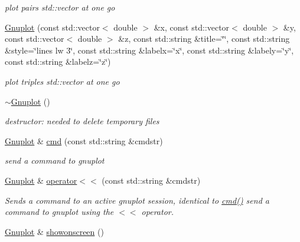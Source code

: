 \begin{DoxyCompactItemize}
\begin{DoxyCompactList}\small\item\em plot pairs std\+::vector at one go \end{DoxyCompactList}\item 
\hyperlink{classkukadu_1_1Gnuplot_a871b56fac856507973efb00861f7cd06}{Gnuplot} (const std\+::vector$<$ double $>$ \&x, const std\+::vector$<$ double $>$ \&y, const std\+::vector$<$ double $>$ \&z, const std\+::string \&title=\char`\"{}\char`\"{}, const std\+::string \&style=\char`\"{}lines lw 3\char`\"{}, const std\+::string \&labelx=\char`\"{}x\char`\"{}, const std\+::string \&labely=\char`\"{}y\char`\"{}, const std\+::string \&labelz=\char`\"{}z\char`\"{})\hypertarget{classkukadu_1_1Gnuplot_a871b56fac856507973efb00861f7cd06}{}\label{classkukadu_1_1Gnuplot_a871b56fac856507973efb00861f7cd06}

\begin{DoxyCompactList}\small\item\em plot triples std\+::vector at one go \end{DoxyCompactList}\item 
\hyperlink{classkukadu_1_1Gnuplot_a512e0f34eacae8a6a819b0b74fab029b}{$\sim$\+Gnuplot} ()\hypertarget{classkukadu_1_1Gnuplot_a512e0f34eacae8a6a819b0b74fab029b}{}\label{classkukadu_1_1Gnuplot_a512e0f34eacae8a6a819b0b74fab029b}

\begin{DoxyCompactList}\small\item\em destructor\+: needed to delete temporary files \end{DoxyCompactList}\item 
\hyperlink{classkukadu_1_1Gnuplot}{Gnuplot} \& \hyperlink{classkukadu_1_1Gnuplot_a02945efc7719ceb26b97bdee6dfa0c76}{cmd} (const std\+::string \&cmdstr)\hypertarget{classkukadu_1_1Gnuplot_a02945efc7719ceb26b97bdee6dfa0c76}{}\label{classkukadu_1_1Gnuplot_a02945efc7719ceb26b97bdee6dfa0c76}

\begin{DoxyCompactList}\small\item\em send a command to gnuplot \end{DoxyCompactList}\item 
\hyperlink{classkukadu_1_1Gnuplot}{Gnuplot} \& \hyperlink{classkukadu_1_1Gnuplot_a76d956598dab9d160127acf2c7d06e1f}{operator$<$$<$} (const std\+::string \&cmdstr)
\begin{DoxyCompactList}\small\item\em Sends a command to an active gnuplot session, identical to \hyperlink{classkukadu_1_1Gnuplot_a02945efc7719ceb26b97bdee6dfa0c76}{cmd()} send a command to gnuplot using the $<$$<$ operator. \end{DoxyCompactList}\item 
\hyperlink{classkukadu_1_1Gnuplot}{Gnuplot} \& \hyperlink{classkukadu_1_1Gnuplot_a88c750479a441fe5e0113e7f795d6f42}{showonscreen} ()\hypertarget{classkukadu_1_1Gnuplot_a88c750479a441fe5e0113e7f795d6f42}{}\label{classkukadu_1_1Gnuplot_a88c750479a441fe5e0113e7f795d6f42}


\end{DoxyCompactItemize}
